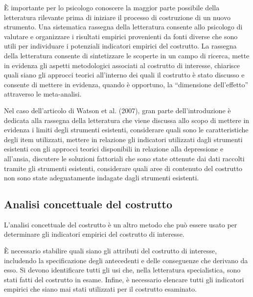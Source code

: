 È importante per lo psicologo conoscere la maggior parte possibile della letteratura rilevante prima di iniziare il processo di costruzione di un nuovo strumento. Una sistematica rassegna della letteratura consente allo psicologo di valutare e organizzare i risultati empirici provenienti da fonti diverse che sono utili per individuare i potenziali indicatori empirici del costrutto. La rassegna della letteratura consente di sintetizzare le scoperte in un campo di ricerca, mette in evidenza gli aspetti metodologici associati al costrutto di interesse, chiarisce quali siano gli approcci teorici all'interno dei quali il costrutto è stato discusso e consente di mettere in evidenza, quando è opportuno, la ``dimensione dell'effetto'' attraverso le meta-analisi.


\begin{exmp}
Nel caso dell'articolo di Watson et al. (2007), gran parte dell'introduzione è dedicata alla rassegna della letteratura che viene discussa allo scopo di mettere in evidenza i limiti degli strumenti esistenti, considerare quali sono le caratteristiche degli item utilizzati, mettere in relazione gli indicatori utilizzati dagli strumenti esistenti con gli approcci teorici disponibili in relazione alla depressione e all'ansia, discutere le soluzioni fattoriali che sono state ottenute dai dati raccolti tramite gli strumenti esistenti, considerare quali aree di contenuto del costrutto non sono state adeguatamente indagate dagli strumenti esistenti.
\end{exmp}

\subsection{Analisi concettuale del costrutto}

L'analisi concettuale del costrutto è un altro metodo che può essere usato per determinare gli indicatori empirici del costrutto di interesse. 

È necessario stabilire quali siano gli attributi del costrutto di interesse, includendo la specificazione degli antecedenti e delle conseguenze che derivano da esso. Si devono identificare tutti gli usi che, nella letteratura specialistica, sono stati fatti del costrutto in esame. Infine, è necessario elencare tutti gli indicatori empirici che siano mai stati utilizzati per il costrutto esaminato. 

